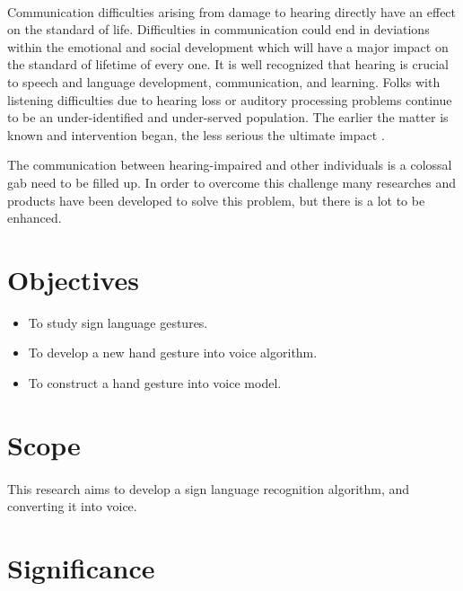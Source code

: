 \documentclass[12pt]{report}
\begin{document}
            \paragraph{}
                Communication difficulties arising from damage to hearing
                directly have an effect on the standard of life. Difficulties in communication could
                end in deviations within the emotional and social development which
                will have a major impact on the standard of lifetime of every one.
                It is well recognized that hearing is crucial to speech and language development, communication, and learning.
                Folks with listening difficulties due to hearing loss or auditory processing problems
                continue to be an under-identified and under-served population. The
                earlier the matter is known and intervention began, the less
                serious the ultimate impact \cite{Frajtag12017}.

                The communication between hearing-impaired and other individuals is a colossal gab 
                need to be filled up. In order to overcome this challenge 
                many researches and products have been developed to solve this problem, 
                but there is a lot to be enhanced.
        
        \section{Objectives}
            \begin{itemize}
                \item To study sign language gestures.
                \item To develop a new hand gesture into voice algorithm.
                \item To construct a hand gesture into voice model.
            \end{itemize}
        
        \section{Scope}
            \paragraph{}
                This research aims to develop a sign language recognition algorithm,
                and converting it into voice.
        \section{Significance}
\end{document}
